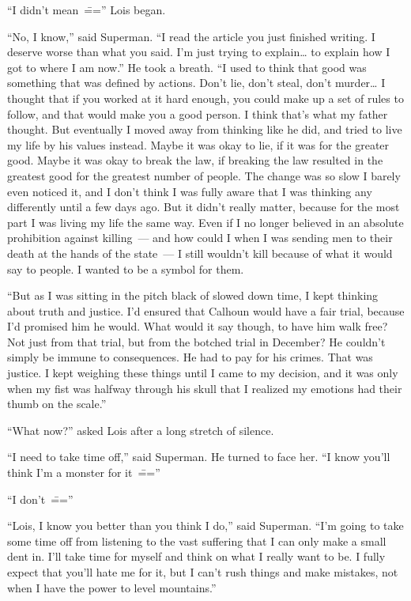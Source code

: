 \documentclass[ebook,12pt]{memoir}
\begin{document}
``I didn't mean~\==='' Lois began.

``No, I know,'' said Superman. ``I read the article you just finished
writing. I deserve worse than what you said. I'm just trying to
explain\ldots{} to explain how I got to where I am now.'' He took a
breath. ``I used to think that good was something that was defined by
actions. Don't lie, don't steal, don't murder\ldots{} I thought that if
you worked at it hard enough, you could make up a set of rules to
follow, and that would make you a good person. I think that's what my
father thought. But eventually I moved away from thinking like he did,
and tried to live my life by his values instead. Maybe it was okay to
lie, if it was for the greater good. Maybe it was okay to break the law,
if breaking the law resulted in the greatest good for the greatest
number of people. The change was so slow I barely even noticed it, and I
don't think I was fully aware that I was thinking any differently until
a few days ago. But it didn't really matter, because for the most part I
was living my life the same way. Even if I no longer believed in an
absolute prohibition against killing~--- and how could I when I was
sending men to their death at the hands of the state~--- I still
wouldn't kill because of what it would say to people. I wanted to be a
symbol for them.

``But as I was sitting in the pitch black of slowed down time, I kept
thinking about truth and justice. I'd ensured that Calhoun would have a
fair trial, because I'd promised him he would. What would it say though,
to have him walk free? Not just from that trial, but from the botched
trial in December? He couldn't simply be immune to consequences. He had
to pay for his crimes. That was justice. I kept weighing these things
until I came to my decision, and it was only when my fist was halfway
through his skull that I realized my emotions had their thumb on the
scale.''

``What now?'' asked Lois after a long stretch of silence.

``I need to take time off,'' said Superman. He turned to face her. ``I
know you'll think I'm a monster for it~\===''

``I don't~\===''

``Lois, I know you better than you think I do,'' said Superman. ``I'm
going to take some time off from listening to the vast suffering that I
can only make a small dent in. I'll take time for myself and think on
what I really want to be. I fully expect that you'll hate me for it, but
I can't rush things and make mistakes, not when I have the power to
level mountains.''
\end{document}
